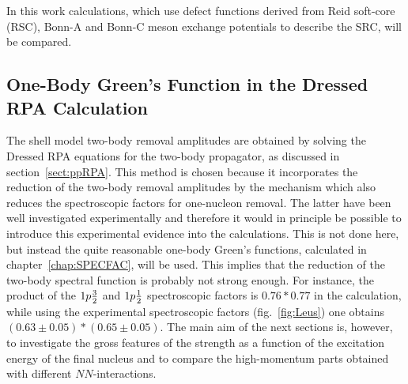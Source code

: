 In this work calculations, which use defect functions
derived from Reid soft-core (RSC),  Bonn-A and Bonn-C meson exchange potentials
to describe the SRC, will be compared. 

\subsection{One-Body Green's Function in the Dressed RPA Calculation}
The shell model two-body removal amplitudes are obtained by solving the 
Dressed RPA equations for the two-body propagator, as discussed in 
section~\ref{sect:ppRPA}. This method is chosen because it incorporates the 
reduction of the two-body removal amplitudes by the mechanism which also 
reduces the spectroscopic factors for one-nucleon removal. The latter have 
been well investigated experimentally\cite{Leu94} and therefore it would in 
principle be possible to introduce this experimental evidence into the 
calculations. This is not done here, but instead the quite reasonable 
one-body Green's functions, calculated in chapter~\ref{chap:SPECFAC}, will be 
used. This implies that the reduction of the two-body spectral function is 
probably not strong enough. For instance, the product of the 
$1p{\mbox{$\frac{3}{2}$}}$ and $1p{\mbox{$\frac{1}{2}$}}$ spectroscopic factors is 
$0.76*0.77$ in the calculation, while using the experimental spectroscopic 
factors (fig.~\ref{fig:Leus}) one obtains 
$(0.63\pm{0.05})*(0.65\pm{0.05})$. 
The main aim of the next sections is, however, to investigate the 
gross features of the strength as a function of the excitation energy of the 
final nucleus and to compare the 
high-momentum parts obtained with different $NN$-interactions.

